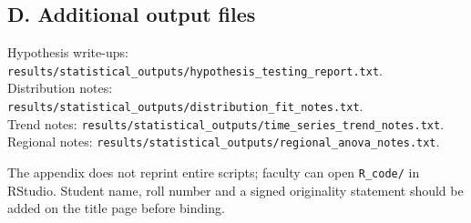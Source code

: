 \documentclass[
]{article}
\begin{document}
\subsection{D. Additional output
files}\label{d.-additional-output-files}

Hypothesis write-ups:
\texttt{results/statistical\_outputs/hypothesis\_testing\_report.txt}.\\
Distribution notes:
\texttt{results/statistical\_outputs/distribution\_fit\_notes.txt}.\\
Trend notes:
\texttt{results/statistical\_outputs/time\_series\_trend\_notes.txt}.\\
Regional notes:
\texttt{results/statistical\_outputs/regional\_anova\_notes.txt}.

The appendix does not reprint entire scripts; faculty can open
\texttt{R\_code/} in RStudio. Student name, roll number and a signed
originality statement should be added on the title page before binding.
\end{document}
